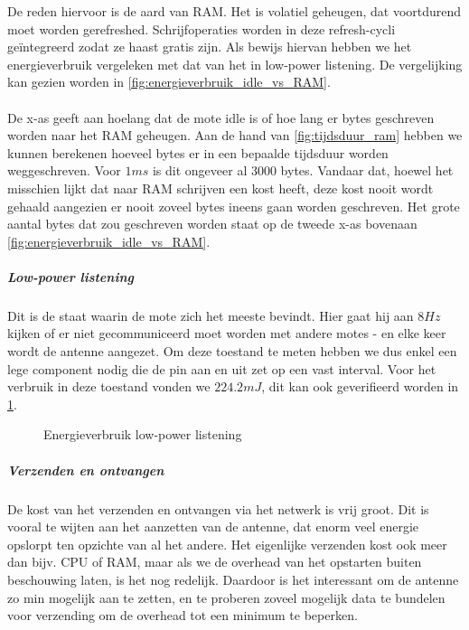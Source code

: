 \documentclass[11pt]{article}
\begin{document}
De reden hiervoor is de aard van RAM. Het is volatiel geheugen, dat voortdurend
moet worden gerefreshed. Schrijfoperaties worden in deze refresh-cycli
ge\"integreerd zodat ze haast gratis zijn. Als bewijs hiervan hebben we het energieverbruik vergeleken met dat van het in low-power listening. 
De vergelijking kan gezien worden in \ref{fig:energieverbruik_idle_vs_RAM}.\\
\\
De x-as geeft aan hoelang dat de mote idle is of hoe lang er bytes geschreven worden naar het RAM geheugen. Aan de hand van \ref{fig:tijdsduur_ram} hebben we kunnen berekenen hoeveel bytes er in een bepaalde tijdsduur worden weggeschreven. Voor $1ms$ is dit ongeveer al 3000 bytes. Vandaar dat, hoewel het misschien lijkt dat naar RAM schrijven een kost heeft, deze kost nooit wordt gehaald aangezien er nooit zoveel bytes ineens gaan worden geschreven. Het grote aantal bytes dat zou geschreven worden staat op de tweede x-as bovenaan \ref{fig:energieverbruik_idle_vs_RAM}. 
\subparagraph{Low-power listening}
Dit is de staat waarin de mote zich het meeste bevindt. Hier gaat hij aan $8Hz$
kijken of er niet gecommuniceerd moet worden met andere motes - en elke keer
wordt de antenne aangezet. Om deze toestand te meten hebben we dus enkel een
lege component nodig die de pin aan en uit zet op een vast interval. Voor het
verbruik in deze toestand vonden we $224.2mJ$, dit kan ook geverifieerd worden
in \ref{fig:energieverbruik_lpl}.

\begin{figure}[h]
\centering

\caption{Energieverbruik low-power listening}
\label{fig:energieverbruik_lpl}
\end{figure}


\subparagraph{Verzenden en ontvangen}

De kost van het verzenden en ontvangen via het netwerk is vrij groot. Dit is
vooral te wijten aan het aanzetten van de antenne, dat enorm veel energie
opslorpt ten opzichte van al het andere. Het eigenlijke verzenden kost ook meer
dan bijv. CPU of RAM, maar als we de overhead van het opstarten buiten
beschouwing laten, is het nog redelijk. Daardoor is het interessant om de
antenne zo min mogelijk aan te zetten, en te proberen zoveel mogelijk data te
bundelen voor verzending om de overhead tot een minimum te beperken.
\end{document}
